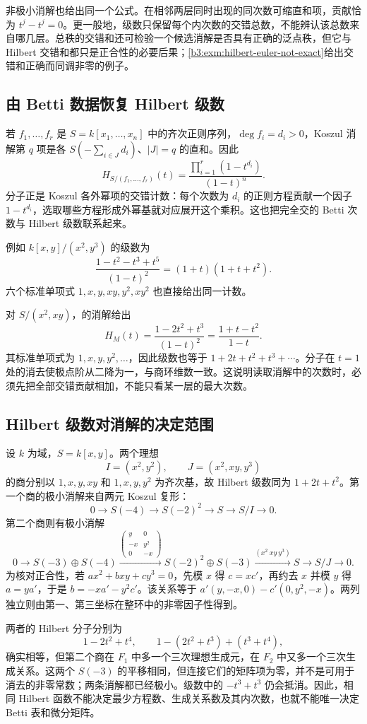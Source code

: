 非极小消解也给出同一个公式。在相邻两层同时出现的同次数可缩直和项，贡献恰为 \(t^j-t^j=0\)。更一般地，级数只保留每个内次数的交错总数，不能辨认该总数来自哪几层。总秩的交错和还可检验一个候选消解是否具有正确的泛点秩，但它与 Hilbert 交错和都只是正合性的必要后果；\cref{b3:exm:hilbert-euler-not-exact}给出交错和正确而同调非零的例子。

\subsection{由 Betti 数据恢复 Hilbert 级数}
\label{b3:subsec:2103:02}

若 \(f_1,\ldots,f_r\) 是 \(S=k[x_1,\ldots,x_n]\) 中的齐次正则序列，\(\deg f_i=d_i>0\)，Koszul 消解第 \(q\) 项是各 \(S(-\sum_{i\in J}d_i)\)、\(|J|=q\) 的直和。因此
\[
	H_{S/(f_1,\ldots,f_r)}(t) =\frac{\prod_{i=1}^r(1-t^{d_i})}{(1-t)^n}.
\]
分子正是 Koszul 各外幂项的交错计数：每个次数为 \(d_i\) 的正则方程贡献一个因子 \(1-t^{d_i}\)，选取哪些方程形成外幂基就对应展开这个乘积。这也把完全交的 Betti 次数与 Hilbert 级数联系起来。

\ProseParagraphBreak
例如 \(k[x,y]/(x^2,y^3)\) 的级数为
\[
	\frac{1-t^2-t^3+t^5}{(1-t)^2} =(1+t)(1+t+t^2).
\]
六个标准单项式 \(1,x,y,xy,y^2,xy^2\) 也直接给出同一计数。

\ProseParagraphBreak
对 \(S/(x^2,xy)\)，的消解给出
\[
	H_M(t)=\frac{1-2t^2+t^3}{(1-t)^2} =\frac{1+t-t^2}{1-t}.
\]
其标准单项式为 \(1,x,y,y^2,\ldots\)，因此级数也等于 \(1+2t+t^2+t^3+\cdots\)。分子在 \(t=1\) 处的消去使极点阶从二降为一，与商环维数一致。这说明读取消解中的次数时，必须先把全部交错贡献相加，不能只看某一层的最大次数。

\subsection{Hilbert 级数对消解的决定范围}
\label{b3:subsec:2103:03}

设 \(k\) 为域，\(S=k[x,y]\)。两个理想
\[
	I=(x^2,y^2),\qquad J=(x^2,xy,y^3)
\]
的商分别以 \(1,x,y,xy\) 和 \(1,x,y,y^2\) 为齐次基，故 Hilbert 级数同为 \(1+2t+t^2\)。第一个商的极小消解来自两元 Koszul 复形：
\[
	0\longrightarrow S(-4)\longrightarrow S(-2)^2 \longrightarrow S\longrightarrow S/I\longrightarrow0.
\]
第二个商则有极小消解
\[
	0\longrightarrow S(-3)\oplus S(-4)
	\xrightarrow{\left(\begin{smallmatrix}y&0\\-x&y^2\\0&-x\end{smallmatrix}\right)}
	S(-2)^2\oplus S(-3)\xrightarrow{(x^2\ xy\ y^3)} S\longrightarrow S/J\longrightarrow0.
\]
为核对正合性，若 \(ax^2+bxy+cy^3=0\)，先模 \(x\) 得 \(c=xc'\)，再约去 \(x\) 并模 \(y\) 得 \(a=ya'\)，于是 \(b=-xa'-y^2c'\)。该关系等于 \(a'(y,-x,0)-c'(0,y^2,-x)\)。两列独立则由第一、第三坐标在整环中的非零因子性得到。

\ProseParagraphBreak
两者的 Hilbert 分子分别为
\[
	1-2t^2+t^4, \qquad1-(2t^2+t^3)+(t^3+t^4),
\]
确实相等，但第二个商在 \(F_1\) 中多一个三次理想生成元，在 \(F_2\) 中又多一个三次生成关系。这两个 \(S(-3)\) 的平移相同，但连接它们的矩阵项为零，并不是可用于消去的非零常数；两条消解都已经极小。级数中的 \(-t^3+t^3\) 仍会抵消。因此，相同 Hilbert 函数不能决定最少方程数、生成关系数及其内次数，也就不能唯一决定 Betti 表和微分矩阵。
